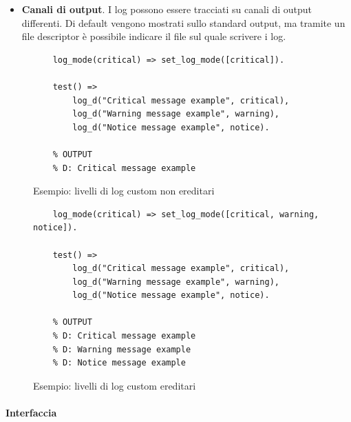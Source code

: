 \documentclass[12pt,a4paper,openright]{book} %
\begin{document}
\begin{itemize}
	\item \textbf{Canali di output}. I log possono essere
          tracciati su canali di output differenti. Di default vengono
          mostrati sullo standard output, ma tramite un file
          descriptor è possibile indicare il file sul quale scrivere i
          log.
\end{itemize}

\begin{figure}
	\begin{verbatim}
	log_mode(critical) => set_log_mode([critical]).

	test() =>
	    log_d("Critical message example", critical),
	    log_d("Warning message example", warning),
	    log_d("Notice message example", notice).

	% OUTPUT
	% D: Critical message example

	\end{verbatim}

	\caption{Esempio: livelli di log custom non ereditari}
	\label{fig:example_loglevel_noinheritance}
\end{figure}

\begin{figure}
	\begin{verbatim}
	log_mode(critical) => set_log_mode([critical, warning, notice]).

	test() =>
	    log_d("Critical message example", critical),
	    log_d("Warning message example", warning),
	    log_d("Notice message example", notice).

	% OUTPUT
	% D: Critical message example
	% D: Warning message example
	% D: Notice message example
	\end{verbatim}
	\caption{Esempio: livelli di log custom ereditari}
	\label{fig:example_loglevel_inheritance}
\end{figure}

\paragraph{Interfaccia}
\end{document}
